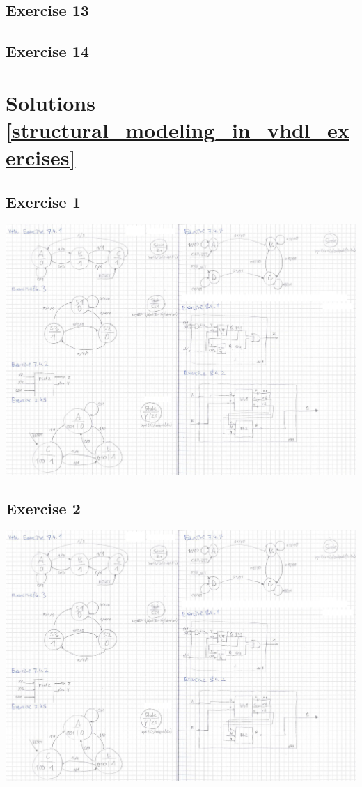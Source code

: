\subsection*{Exercise 13}

\subsection*{Exercise 14}

\section{Solutions \ref{structural_modeling_in_vhdl_exercises}~}
\subsection*{Exercise 1}
\includegraphics[width=\textwidth, clip, trim={1563 958 681 790}]{pics/solutions/chapter7+8_draft.jpg}

\subsection*{Exercise 2}
\includegraphics[width=\textwidth, clip, trim={1618 275 332 1394}]{pics/solutions/chapter7+8_draft.jpg}

